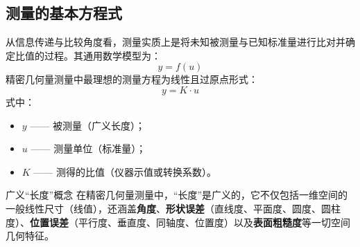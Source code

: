 \documentclass[11pt,a4paper]{ctexart}
\begin{document}
\subsection{测量的基本方程式}
从信息传递与比较角度看，测量实质上是将未知被测量与已知标准量进行比对并确定比值的过程。其通用数学模型为：
\begin{equation}
y = f(u)
\end{equation}
精密几何量测量中最理想的测量方程为线性且过原点形式：
\begin{equation}
y = K \cdot u
\end{equation}
式中：
\begin{itemize}[leftmargin=1.5em, itemsep=2pt]
    \item $y$ —— 被测量（广义长度）；
    \item $u$ —— 测量单位（标准量）；
    \item $K$ —— 测得的比值（仪器示值或转换系数）。
\end{itemize}
\begin{pointbox}{广义“长度”概念}
在精密几何量测量中，“长度”是广义的，它不仅包括一维空间的一般线性尺寸（线值），还涵盖\textbf{角度}、\textbf{形状误差}（直线度、平面度、圆度、圆柱度）、\textbf{位置误差}（平行度、垂直度、同轴度、位置度）以及\textbf{表面粗糙度}等一切空间几何特征。
\end{pointbox}
\end{document}
